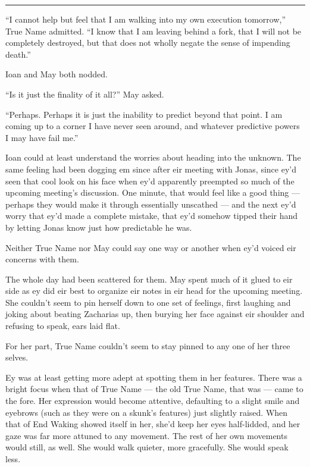 \begin{center}\rule{0.5\linewidth}{0.5pt}\end{center}

``I cannot help but feel that I am walking into my own execution tomorrow,'' True Name admitted. ``I know that I am leaving behind a fork, that I will not be completely destroyed, but that does not wholly negate the sense of impending death.''

Ioan and May both nodded.

``Is it just the finality of it all?'' May asked.

``Perhaps. Perhaps it is just the inability to predict beyond that point. I am coming up to a corner I have never seen around, and whatever predictive powers I may have fail me.''

Ioan could at least understand the worries about heading into the unknown. The same feeling had been dogging em since after eir meeting with Jonas, since ey'd seen that cool look on his face when ey'd apparently preempted so much of the upcoming meeting's discussion. One minute, that would feel like a good thing — perhaps they would make it through essentially unscathed — and the next ey'd worry that ey'd made a complete mistake, that ey'd somehow tipped their hand by letting Jonas know just how predictable he was.

Neither True Name nor May could say one way or another when ey'd voiced eir concerns with them.

The whole day had been scattered for them. May spent much of it glued to eir side as ey did eir best to organize eir notes in eir head for the upcoming meeting. She couldn't seem to pin herself down to one set of feelings, first laughing and joking about beating Zacharias up, then burying her face against eir shoulder and refusing to speak, ears laid flat.

For her part, True Name couldn't seem to stay pinned to any one of her three selves.

Ey was at least getting more adept at spotting them in her features. There was a bright focus when that of True Name — the old True Name, that was — came to the fore. Her expression would become attentive, defaulting to a slight smile and eyebrows (such as they were on a skunk's features) just slightly raised. When that of End Waking showed itself in her, she'd keep her eyes half-lidded, and her gaze was far more attuned to any movement. The rest of her own movements would still, as well. She would walk quieter, more gracefully. She would speak less.

